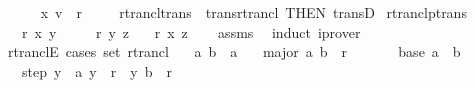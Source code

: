 \begin{isabellebody}
\ \ \ \ \isamarkupfalse%
\ {\isachardoublequoteopen}{\isacharparenleft}{\kern0pt}x{\isacharcomma}{\kern0pt}\ v{\isacharparenright}{\kern0pt}\ {\isasymin}\ r\isactrlsup {\isacharasterisk}{\kern0pt}{\isachardoublequoteclose}\ \isacommand{{\isachardot}{\kern0pt}{\isachardot}{\kern0pt}}\isamarkupfalse%
\isanewline
\ \ \isamarkupfalse%
\isanewline
{}\isamarkupfalse%
%
\endisatagproof
{\isafoldproof}%
%
\isadelimproof
\isanewline
%
\endisadelimproof
\isanewline
{}\isamarkupfalse%
\ rtrancl{\isacharunderscore}{\kern0pt}trans\ {\isacharequal}{\kern0pt}\ trans{\isacharunderscore}{\kern0pt}rtrancl\ {\isacharbrackleft}{\kern0pt}THEN\ transD{\isacharbrackright}{\kern0pt}\isanewline
\isanewline
{}\isamarkupfalse%
\ rtranclp{\isacharunderscore}{\kern0pt}trans{\isacharcolon}{\kern0pt}\isanewline
\ \ \ {\isachardoublequoteopen}r\isactrlsup {\isacharasterisk}{\kern0pt}\isactrlsup {\isacharasterisk}{\kern0pt}\ x\ y{\isachardoublequoteclose}\isanewline
\ \ \ \ \ {\isachardoublequoteopen}r\isactrlsup {\isacharasterisk}{\kern0pt}\isactrlsup {\isacharasterisk}{\kern0pt}\ y\ z{\isachardoublequoteclose}\isanewline
\ \ \ {\isachardoublequoteopen}r\isactrlsup {\isacharasterisk}{\kern0pt}\isactrlsup {\isacharasterisk}{\kern0pt}\ x\ z{\isachardoublequoteclose}\isanewline
%
\isadelimproof
\ \ %
\endisadelimproof
%
\isatagproof
{}\isamarkupfalse%
\ assms{\isacharparenleft}{\kern0pt}{}{\isacharcomma}{\kern0pt}{}{\isacharparenright}{\kern0pt}\ \isamarkupfalse%
\ induct\ iprover{\isacharplus}{\kern0pt}%
\endisatagproof
{\isafoldproof}%
%
\isadelimproof
\isanewline
%
\endisadelimproof
\isanewline
{}\isamarkupfalse%
\ rtranclE\ {\isacharbrackleft}{\kern0pt}cases\ set{\isacharcolon}{\kern0pt}\ rtrancl{\isacharbrackright}{\kern0pt}{\isacharcolon}{\kern0pt}\isanewline
\ \ \ a\ b\ {\isacharcolon}{\kern0pt}{\isacharcolon}{\kern0pt}\ {\isacharprime}{\kern0pt}a\isanewline
\ \ \ major{\isacharcolon}{\kern0pt}\ {\isachardoublequoteopen}{\isacharparenleft}{\kern0pt}a{\isacharcomma}{\kern0pt}\ b{\isacharparenright}{\kern0pt}\ {\isasymin}\ r\isactrlsup {\isacharasterisk}{\kern0pt}{\isachardoublequoteclose}\isanewline
\ \ \isanewline
\ \ \ \ {\isacharparenleft}{\kern0pt}base{\isacharparenright}{\kern0pt}\ {\isachardoublequoteopen}a\ {\isacharequal}{\kern0pt}\ b{\isachardoublequoteclose}\isanewline
\ \ {\isacharbar}{\kern0pt}\ {\isacharparenleft}{\kern0pt}step{\isacharparenright}{\kern0pt}\ y\ \ {\isachardoublequoteopen}{\isacharparenleft}{\kern0pt}a{\isacharcomma}{\kern0pt}\ y{\isacharparenright}{\kern0pt}\ {\isasymin}\ r\isactrlsup {\isacharasterisk}{\kern0pt}{\isachardoublequoteclose}\ \ {\isachardoublequoteopen}{\isacharparenleft}{\kern0pt}y{\isacharcomma}{\kern0pt}\ b{\isacharparenright}{\kern0pt}\ {\isasymin}\ r{\isachardoublequoteclose}\isanewline

\end{isabellebody}
